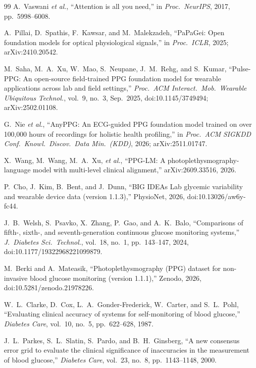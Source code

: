 \begin{thebibliography}{99}
A.~Vaswani \emph{et al.}, ``Attention is all you need,'' in \emph{Proc.\
NeurIPS}, 2017, pp.~5998--6008.

A.~Pillai, D.~Spathis, F.~Kawsar, and M.~Malekzadeh, ``PaPaGei: Open foundation models for optical
physiological signals,'' in \emph{Proc.\ ICLR}, 2025; arXiv:2410.20542.

M.~Saha, M.~A.~Xu, W.~Mao, S.~Neupane, J.~M.~Rehg, and S.~Kumar,
``Pulse-PPG: An open-source field-trained PPG foundation model for wearable
applications across lab and field settings,'' \emph{Proc.\ ACM Interact.\
Mob.\ Wearable Ubiquitous Technol.}, vol.~9, no.~3, Sep.\ 2025,
doi:10.1145/3749494; arXiv:2502.01108.

G.~Nie \emph{et al.}, ``AnyPPG: An ECG-guided PPG foundation model
trained on over 100,000 hours of recordings for holistic health profiling,''
in \emph{Proc.\ ACM SIGKDD Conf.\ Knowl.\ Discov.\ Data Min.\ (KDD)}, 2026;
arXiv:2511.01747.

X.~Wang, M.~Wang, M.~A.~Xu, \emph{et al.}, ``PPG-LM: A photoplethysmography-language
model with multi-level clinical alignment,'' arXiv:2609.33516, 2026.

\bibitem{cho2026bigideas}
P.~Cho, J.~Kim, B.~Bent, and J.~Dunn, ``BIG IDEAs Lab glycemic variability
and wearable device data (version 1.1.3),'' PhysioNet, 2026,
doi:10.13026/aw6y-fc44.

J.~B.~Welsh, S.~Psavko, X.~Zhang, P.~Gao, and A.~K.~Balo, ``Comparisons of
fifth-, sixth-, and seventh-generation continuous glucose monitoring
systems,'' \emph{J.\ Diabetes Sci.\ Technol.}, vol.~18, no.~1, pp.~143--147,
2024, doi:10.1177/19322968221099879.

M.~Berki and A.~Mateasik, ``Photoplethysmography (PPG) dataset for
non-invasive blood glucose monitoring (version 1.1.1),'' Zenodo, 2026,
doi:10.5281/zenodo.21978226.

W.~L.~Clarke, D.~Cox, L.~A.~Gonder-Frederick, W.~Carter, and S.~L.~Pohl,
``Evaluating clinical accuracy of systems for self-monitoring of blood
glucose,'' \emph{Diabetes Care}, vol.~10, no.~5, pp.~622--628, 1987.

\bibitem{parkes2000}
J.~L.~Parkes, S.~L.~Slatin, S.~Pardo, and B.~H.~Ginsberg, ``A new consensus
error grid to evaluate the clinical significance of inaccuracies in the
measurement of blood glucose,'' \emph{Diabetes Care}, vol.~23, no.~8,
pp.~1143--1148, 2000.


\end{thebibliography}
